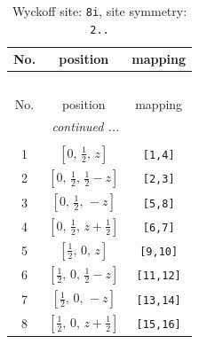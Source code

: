 \documentclass[fleqn,8pt]{jsarticle}
\begin{document}
\renewcommand{\arraystretch}{1.2}
\begin{longtable}{ccc}
\caption{Wyckoff site: {\tt 8i}, site symmetry: {\tt 2..}}
 \\
 \hline \hline
No. & position & mapping \\ \hline \endfirsthead

\multicolumn{2}{l}{\tablename\ \thetable{}} \\
 \hline \hline
No. & position & mapping \\ \hline \endhead

 \hline \hline
\multicolumn{2}{r}{\footnotesize\it continued ...} \\ \endfoot

 \hline \hline
\multicolumn{2}{r}{} \\ \endlastfoot

1 & $\left[ 0,\, \frac{1}{2},\, z \right]$ & {\tt [1,4]} \\ \hline
2 & $\left[ 0,\, \frac{1}{2},\, \frac{1}{2} - z \right]$ & {\tt [2,3]} \\ \hline
3 & $\left[ 0,\, \frac{1}{2},\, - z \right]$ & {\tt [5,8]} \\ \hline
4 & $\left[ 0,\, \frac{1}{2},\, z + \frac{1}{2} \right]$ & {\tt [6,7]} \\ \hline
5 & $\left[ \frac{1}{2},\, 0,\, z \right]$ & {\tt [9,10]} \\ \hline
6 & $\left[ \frac{1}{2},\, 0,\, \frac{1}{2} - z \right]$ & {\tt [11,12]} \\ \hline
7 & $\left[ \frac{1}{2},\, 0,\, - z \right]$ & {\tt [13,14]} \\ \hline
8 & $\left[ \frac{1}{2},\, 0,\, z + \frac{1}{2} \right]$ & {\tt [15,16]} \\
\end{longtable}
\renewcommand{\arraystretch}{1.2}
\end{document}
